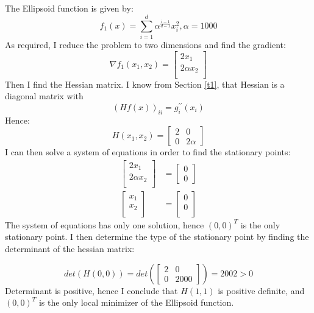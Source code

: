 \documentclass[a4paper]{article}
\begin{document}
\section{}
\label{t4}
The Ellipsoid function is given by:
\[
f_{1}(x)=\sum_{i=1}^{d} \alpha^{\frac{i-1}{d-1}} x_{i}^{2}, \alpha=1000
\]
As required, I reduce the problem to two dimensions and find the gradient:
\[
\nabla f_1(x_1,x_2) = 
\begin{bmatrix}
    2 x_1\\
    2\alpha x_2\\
\end{bmatrix}
\]
Then I find the Hessian matrix. I know from Section \ref{t1}, that
Hessian is a diagonal matrix with 
\[
(H f(x))_{i  i}=g_{i}^{\prime \prime}\left(x_{i}\right)
\]
Hence:
\[
H(x_1, x_2) = 
\begin{bmatrix}
    2 & 0     \\
    0 & 2\alpha
\end{bmatrix}
\]
I can then solve a system of equations in order to find the stationary points:
\begin{align*}
\begin{bmatrix}
    2 x_1 \\
    2\alpha x_2 \\
\end{bmatrix}
&=
\begin{bmatrix}
    0 \\
    0    
\end{bmatrix}\\
\begin{bmatrix}
    x_1 \\
    x_2 \\
\end{bmatrix}
&=
\begin{bmatrix}
    0 \\
    0 \\
\end{bmatrix}
\end{align*}
The system of equations has only one solution, hence $(0,0)^T$ is the only
stationary point. I then determine the type of the stationary point by 
finding the determinant of the hessian matrix:

\[
det(H(0,0)) = 
det\left(\begin{bmatrix}
    2 & 0     \\
    0 & 2000
\end{bmatrix}\right)
= 2002 > 0
\]
Determinant is positive, hence I conclude that
$H(1,1)$ is positive definite, and $(0,0)^T$ is the only local minimizer of the
Ellipsoid function.
\end{document}
